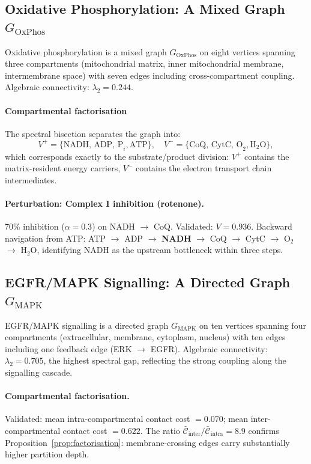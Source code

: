 \documentclass[11pt,twocolumn]{article}
\theoremstyle{plain}
\theoremstyle{definition}
\newcommand{\CC}{\mathcal{C}}
\begin{document}
\subsection{Oxidative Phosphorylation: A Mixed Graph $G_{\text{OxPhos}}$}

Oxidative phosphorylation is a mixed graph $G_{\text{OxPhos}}$ on eight vertices
spanning three compartments (mitochondrial matrix, inner mitochondrial membrane,
intermembrane space) with seven edges including cross-compartment coupling.
Algebraic connectivity: $\lambda_2 = 0.244$.

\paragraph{Compartmental factorisation}
The spectral bisection separates the graph into:
\[
  V^+ = \{\text{NADH, ADP, P}_i, \text{ATP}\}, \quad
  V^- = \{\text{CoQ, CytC, O}_2, \text{H}_2\text{O}\},
\]
which corresponds exactly to the substrate/product division: $V^+$ contains the
matrix-resident energy carriers, $V^-$ contains the electron transport chain
intermediates.

\paragraph{Perturbation: Complex I inhibition (rotenone).}
70\% inhibition ($\alpha = 0.3$) on NADH $\to$ CoQ. Validated: $V = 0.936$.
Backward navigation from ATP: ATP $\to$ ADP $\to$ \textbf{NADH} $\to$ CoQ
$\to$ CytC $\to$ O$_2$ $\to$ H$_2$O, identifying NADH as the upstream
bottleneck within three steps.

\subsection{EGFR/MAPK Signalling: A Directed Graph $G_{\text{MAPK}}$}

EGFR/MAPK signalling is a directed graph $G_{\text{MAPK}}$ on ten vertices
spanning four compartments (extracellular, membrane, cytoplasm, nucleus) with
ten edges including one feedback edge (ERK $\to$ EGFR). Algebraic connectivity:
$\lambda_2 = 0.705$, the highest spectral gap, reflecting the strong coupling
along the signalling cascade.

\paragraph{Compartmental factorisation.}
Validated: mean intra-compartmental contact cost $= 0.070$; mean
inter-compartmental contact cost $= 0.622$. The ratio
$\bar{\CC}_{\text{inter}} / \bar{\CC}_{\text{intra}} = 8.9$ confirms
Proposition~\ref{prop:factorisation}: membrane-crossing edges carry
substantially higher partition depth.
\end{document}

